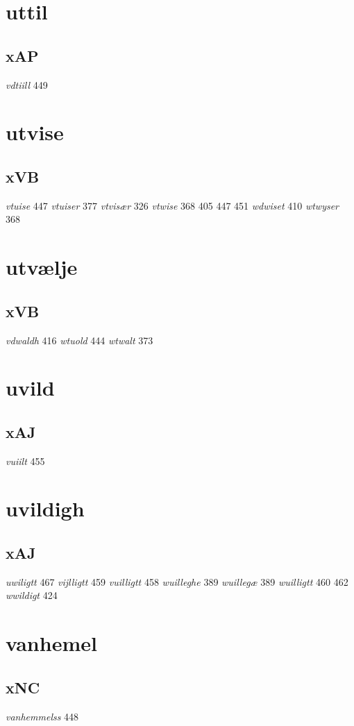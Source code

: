 \documentclass[a4paper,twocolumn]{article}
\begin{document}
\section{uttil}
\label{sec:org1f7a441}
\subsection{xAP}
\label{sec:org0a47f47}
\emph{vdtiill} 449 
\section{utvise}
\label{sec:org277ca9b}
\subsection{xVB}
\label{sec:orgf9e9e64}
\emph{vtuise} 447 \emph{vtuiser} 377 \emph{vtvisær} 326 \emph{vtwise} 368 405 447 451 \emph{wdwiset} 410 \emph{wtwyser} 368 
\section{utvælje}
\label{sec:org92e67e6}
\subsection{xVB}
\label{sec:org322cdd9}
\emph{vdwaldh} 416 \emph{wtuold} 444 \emph{wtwalt} 373 
\section{uvild}
\label{sec:org581fe7d}
\subsection{xAJ}
\label{sec:org0d1c355}
\emph{vuiilt} 455 
\section{uvildigh}
\label{sec:org1ed765d}
\subsection{xAJ}
\label{sec:org156d8e5}
\emph{uwiligtt} 467 \emph{vijlligtt} 459 \emph{vuilligtt} 458 \emph{wuilleghe} 389 \emph{wuillegæ} 389 \emph{wuilligtt} 460 462 \emph{wwildigt} 424 
\section{vanhemel}
\label{sec:org1c324de}
\subsection{xNC}
\label{sec:orga80bbd8}
\emph{vanhemmelss} 448 
\end{document}

